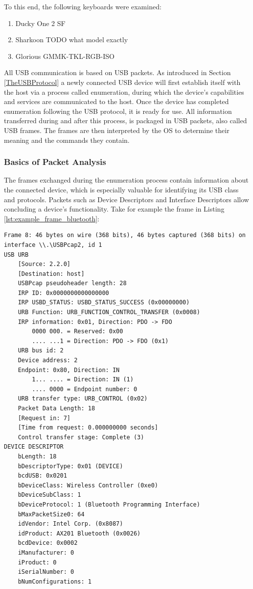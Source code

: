 To this end, the following keyboards were examined:
\begin{enumerate}
    \item Ducky One 2 SF
    \item Sharkoon TODO what model exactly
    \item Glorious GMMK-TKL-RGB-ISO
\end{enumerate}


All USB communication is based on USB packets. As introduced in Section \ref{TheUSBProtocol} a newly connected USB device will first establish itself with the host via a process called enumeration, during which the device's capabilities and services are communicated to the host. Once the device has completed enumeration following the USB protocol, it is ready for use.
All information transferred during and after this process, is packaged in USB packets, also called USB frames. The frames are then interpreted by the OS to determine their meaning and the commands they contain.



\subsubsection{Basics of Packet Analysis}

The frames exchanged during the enumeration process contain information about the connected device, which is especially valuable for identifying its USB class and protocols.
Packets such as Device Descriptors and Interface Descriptors allow concluding a device's functionality. Take for example the frame in Listing \ref{lst:example_frame_bluetooth}:

\begin{lstlisting}[caption={Device Descriptor packet of a wireless controller}, label={lst:example_frame_bluetooth}, captionpos=b]
Frame 8: 46 bytes on wire (368 bits), 46 bytes captured (368 bits) on interface \\.\USBPcap2, id 1
USB URB
    [Source: 2.2.0]
    [Destination: host]
    USBPcap pseudoheader length: 28
    IRP ID: 0x0000000000000000
    IRP USBD_STATUS: USBD_STATUS_SUCCESS (0x00000000)
    URB Function: URB_FUNCTION_CONTROL_TRANSFER (0x0008)
    IRP information: 0x01, Direction: PDO -> FDO
        0000 000. = Reserved: 0x00
        .... ...1 = Direction: PDO -> FDO (0x1)
    URB bus id: 2
    Device address: 2
    Endpoint: 0x80, Direction: IN
        1... .... = Direction: IN (1)
        .... 0000 = Endpoint number: 0
    URB transfer type: URB_CONTROL (0x02)
    Packet Data Length: 18
    [Request in: 7]
    [Time from request: 0.000000000 seconds]
    Control transfer stage: Complete (3)
DEVICE DESCRIPTOR
    bLength: 18
    bDescriptorType: 0x01 (DEVICE)
    bcdUSB: 0x0201
    bDeviceClass: Wireless Controller (0xe0)
    bDeviceSubClass: 1
    bDeviceProtocol: 1 (Bluetooth Programming Interface)
    bMaxPacketSize0: 64
    idVendor: Intel Corp. (0x8087)
    idProduct: AX201 Bluetooth (0x0026)
    bcdDevice: 0x0002
    iManufacturer: 0
    iProduct: 0
    iSerialNumber: 0
    bNumConfigurations: 1
\end{lstlisting}

